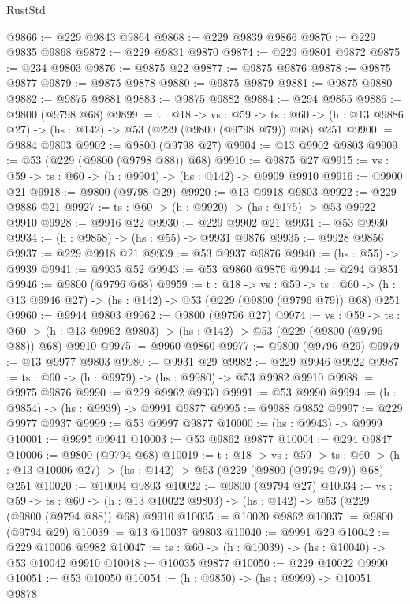 \begin{lexlean}{RustStd}
\begin{coremodule}
@9866 := @229 @9843 @9864
@9868 := @229 @9839 @9866
@9870 := @229 @9835 @9868
@9872 := @229 @9831 @9870
@9874 := @229 @9801 @9872
@9875 := @234 @9803
@9876 := @9875 @22
@9877 := @9875 @9876
@9878 := @9875 @9877
@9879 := @9875 @9878
@9880 := @9875 @9879
@9881 := @9875 @9880
@9882 := @9875 @9881
@9883 := @9875 @9882
@9884 := @294 @9855
@9886 := @9800 (@9798 @68)
@9899 := {t : @18} ->
  {vs : @59} ->
  {ts : @60} -> (h : @13 @9886 @27) -> (hs : @142) -> @53 (@229 (@9800 (@9798 @79)) @68) @251
@9900 := @9884 @9803
@9902 := @9800 (@9798 @27)
@9904 := @13 @9902 @9803
@9909 := @53 (@229 (@9800 (@9798 @88)) @68)
@9910 := @9875 @27
@9915 := {vs : @59} -> {ts : @60} -> (h : @9904) -> (hs : @142) -> @9909 @9910
@9916 := @9900 @21
@9918 := @9800 (@9798 @29)
@9920 := @13 @9918 @9803
@9922 := @229 @9886 @21
@9927 := {ts : @60} -> (h : @9920) -> (hs : @175) -> @53 @9922 @9910
@9928 := @9916 @22
@9930 := @229 @9902 @21
@9931 := @53 @9930
@9934 := (h : @9858) -> (hs : @55) -> @9931 @9876
@9935 := @9928 @9856
@9937 := @229 @9918 @21
@9939 := @53 @9937 @9876
@9940 := (hs : @55) -> @9939
@9941 := @9935 @52
@9943 := @53 @9860 @9876
@9944 := @294 @9851
@9946 := @9800 (@9796 @68)
@9959 := {t : @18} ->
  {vs : @59} ->
  {ts : @60} -> (h : @13 @9946 @27) -> (hs : @142) -> @53 (@229 (@9800 (@9796 @79)) @68) @251
@9960 := @9944 @9803
@9962 := @9800 (@9796 @27)
@9974 := {vs : @59} ->
  {ts : @60} -> (h : @13 @9962 @9803) -> (hs : @142) -> @53 (@229 (@9800 (@9796 @88)) @68) @9910
@9975 := @9960 @9860
@9977 := @9800 (@9796 @29)
@9979 := @13 @9977 @9803
@9980 := @9931 @29
@9982 := @229 @9946 @9922
@9987 := {ts : @60} -> (h : @9979) -> (hs : @9980) -> @53 @9982 @9910
@9988 := @9975 @9876
@9990 := @229 @9962 @9930
@9991 := @53 @9990
@9994 := (h : @9854) -> (hs : @9939) -> @9991 @9877
@9995 := @9988 @9852
@9997 := @229 @9977 @9937
@9999 := @53 @9997 @9877
@10000 := (hs : @9943) -> @9999
@10001 := @9995 @9941
@10003 := @53 @9862 @9877
@10004 := @294 @9847
@10006 := @9800 (@9794 @68)
@10019 := {t : @18} ->
  {vs : @59} ->
  {ts : @60} -> (h : @13 @10006 @27) -> (hs : @142) -> @53 (@229 (@9800 (@9794 @79)) @68) @251
@10020 := @10004 @9803
@10022 := @9800 (@9794 @27)
@10034 := {vs : @59} ->
  {ts : @60} -> (h : @13 @10022 @9803) -> (hs : @142) -> @53 (@229 (@9800 (@9794 @88)) @68) @9910
@10035 := @10020 @9862
@10037 := @9800 (@9794 @29)
@10039 := @13 @10037 @9803
@10040 := @9991 @29
@10042 := @229 @10006 @9982
@10047 := {ts : @60} -> (h : @10039) -> (hs : @10040) -> @53 @10042 @9910
@10048 := @10035 @9877
@10050 := @229 @10022 @9990
@10051 := @53 @10050
@10054 := (h : @9850) -> (hs : @9999) -> @10051 @9878

\end{coremodule}
\end{lexlean}
